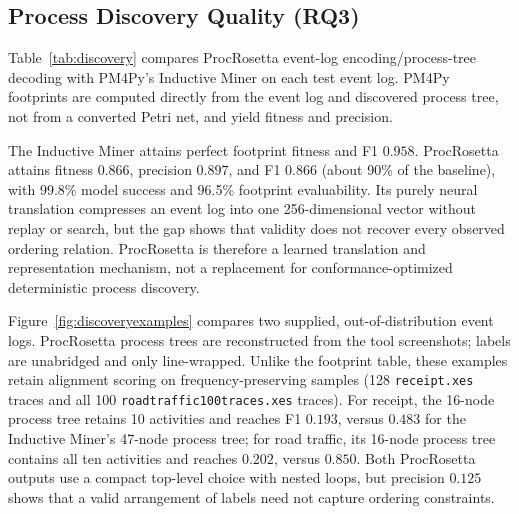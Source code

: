 \documentclass[manuscript,screen,nonacm]{acmart}
\begin{document}
\subsection{Process Discovery Quality (RQ3)}
\label{sec:discoveryresults}



Table~\ref{tab:discovery} compares ProcRosetta event-log encoding/process-tree decoding with PM4Py's Inductive Miner on each test event log. PM4Py footprints are computed directly from the event log and discovered process tree, not from a converted Petri net, and yield fitness and precision.

The Inductive Miner attains perfect footprint fitness and F1 $0.958$. ProcRosetta attains fitness $0.866$, precision $0.897$, and F1 $0.866$ (about 90\% of the baseline), with 99.8\% model success and 96.5\% footprint evaluability. Its purely neural translation compresses an event log into one 256-dimensional vector without replay or search, but the gap shows that validity does not recover every observed ordering relation. ProcRosetta is therefore a learned translation and representation mechanism, not a replacement for conformance-optimized deterministic process discovery.

Figure~\ref{fig:discoveryexamples} compares two supplied, out-of-distribution event logs. ProcRosetta process trees are reconstructed from the tool screenshots; labels are unabridged and only line-wrapped. Unlike the footprint table, these examples retain alignment scoring on frequency-preserving samples (128 \texttt{receipt.xes} traces and all 100 \texttt{roadtraffic100traces.xes} traces). For receipt, the 16-node process tree retains 10 activities and reaches F1 $0.193$, versus $0.483$ for the Inductive Miner's 47-node process tree; for road traffic, its 16-node process tree contains all ten activities and reaches $0.202$, versus $0.850$. Both ProcRosetta outputs use a compact top-level choice with nested loops, but precision $0.125$ shows that a valid arrangement of labels need not capture ordering constraints.
\end{document}
